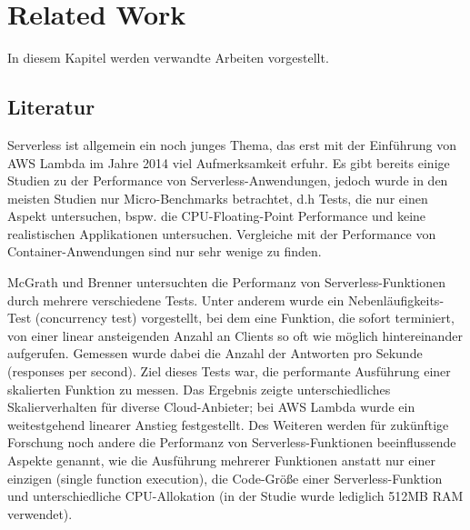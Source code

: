 \chapter{Related Work}
In diesem Kapitel werden verwandte Arbeiten vorgestellt.

\section{Literatur}
Serverless ist allgemein ein noch junges Thema, das erst mit der Einführung von AWS Lambda im Jahre 2014 viel Aufmerksamkeit erfuhr. Es gibt bereits einige Studien zu der Performance von Serverless-Anwendungen, jedoch wurde in den meisten Studien nur Micro-Benchmarks betrachtet, d.h Tests, die nur einen Aspekt untersuchen, bspw. die CPU-Floating-Point Performance und keine realistischen Applikationen untersuchen\cite{scheuner_function-as--service_2020}. Vergleiche mit der Performance von Container-Anwendungen sind nur sehr wenige zu finden. 

McGrath und Brenner untersuchten die Performanz von Serverless-Funktionen durch mehrere verschiedene Tests. Unter anderem wurde ein Nebenläufigkeits-Test (concurrency test) vorgestellt, bei dem eine Funktion, die sofort terminiert, von einer linear ansteigenden Anzahl an Clients so oft wie möglich hintereinander aufgerufen. Gemessen wurde dabei die Anzahl der Antworten pro Sekunde (responses per second). Ziel dieses Tests war, die performante Ausführung einer skalierten Funktion zu messen. Das Ergebnis zeigte unterschiedliches Skalierverhalten für diverse Cloud-Anbieter; bei AWS Lambda wurde ein weitestgehend linearer Anstieg festgestellt. 
Des Weiteren werden für zukünftige Forschung noch andere die Performanz von Serverless-Funktionen beeinflussende Aspekte genannt, wie die Ausführung mehrerer Funktionen anstatt nur einer einzigen (single function execution), die Code-Größe einer Serverless-Funktion und unterschiedliche CPU-Allokation (in der Studie wurde lediglich 512MB RAM verwendet).


